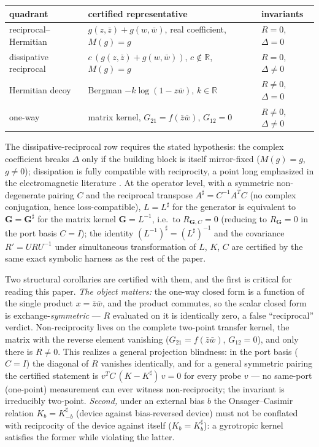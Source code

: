 \documentclass[11pt,a4paper]{article}
\newcommand{\zb}{\bar{z}}
\newcommand{\wb}{\bar{w}}
\begin{document}
\begin{center}
\begin{tabular}{lll}
\hline
quadrant & certified representative & invariants \\
\hline
reciprocal--Hermitian & $g(z,\zb) + g(w,\wb)$, real coefficient, $M(g) = g$ & $R = 0$, $\Delta = 0$ \\
dissipative reciprocal & $c\,(g(z,\zb) + g(w,\wb))$, $c \notin \mathbb{R}$, $M(g) = g$ & $R = 0$, $\Delta \neq 0$ \\
Hermitian decoy & Bergman $-k\log(1 - z\wb)$, $k \in \mathbb{R}$ & $R \neq 0$, $\Delta = 0$ \\
one-way & matrix kernel, $G_{21} = f(\zb\wb)$, $G_{12} = 0$ & $R \neq 0$, $\Delta \neq 0$ \\
\hline
\end{tabular}
\end{center}

The dissipative-reciprocal row requires the stated hypothesis: the complex
coefficient breaks $\Delta$ only if the building block is itself mirror-fixed
($M(g) = g$, $g \neq 0$); dissipation is fully compatible with reciprocity, a
point long emphasized in the electromagnetic literature
\cite{Caloz2018,Silveirinha2019}. At the operator level, with a symmetric
non-degenerate pairing $C$ and the reciprocal transpose
$A^{\sharp} = C^{-1} A^{T} C$ (no complex conjugation, hence loss-compatible),
$L = L^{\sharp}$ for the generator is equivalent to
$\mathbf{G} = \mathbf{G}^{\sharp}$ for the matrix kernel
$\mathbf{G} = L^{-1}$, i.e.\ to $R_{\mathbf{G},C} = 0$ (reducing to
$R_{\mathbf{G}} = 0$ in the port basis $C = I$); the identity
$(L^{-1})^{\sharp} = (L^{\sharp})^{-1}$ and the covariance $R' = U R U^{-1}$
under simultaneous transformation of $L$, $K$, $C$ are certified by the same
exact symbolic harness as the rest of the paper.

Two structural corollaries are certified with them, and the first is critical
for reading this paper. \emph{The object matters:} the one-way closed form is
a function of the single product $x = \zb\wb$, and the product commutes, so
the scalar closed form is exchange-\emph{symmetric} --- $R$ evaluated on it is
identically zero, a false ``reciprocal'' verdict. Non-reciprocity lives on the
complete two-point transfer kernel, the matrix with the reverse element
vanishing ($G_{21} = f(\zb\wb)$, $G_{12} = 0$), and only there is
$R \neq 0$. This realizes a general projection blindness: in the port basis
($C = I$) the diagonal of $R$ vanishes identically, and for a general
symmetric pairing the certified statement is $v^{T} C\,(K - K^{\sharp})\,v
= 0$ for every probe $v$ --- no same-port (one-point) measurement can ever
witness non-reciprocity; the invariant is irreducibly two-point. \emph{Second,} under
an external bias $b$ the Onsager--Casimir relation $K_b = K_{-b}^{\sharp}$
(device against bias-reversed device) must not be conflated with reciprocity
of the device against itself ($K_b = K_b^{\sharp}$): a gyrotropic kernel
satisfies the former while violating the latter.
\end{document}
